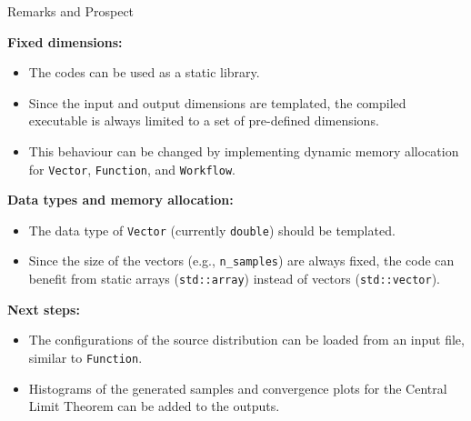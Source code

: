 \documentclass[8pt]{beamer}
\begin{document}
\begin{frame}{Remarks and Prospect}

    \textbf{Fixed dimensions:}
    \begin{itemize}
        \item The codes can be used as a static library.
        \item Since the input and output dimensions are templated, the compiled executable is always limited to a set of pre-defined dimensions.
        \item This behaviour can be changed by implementing dynamic memory allocation for \texttt{Vector}, \texttt{Function}, and \texttt{Workflow}.
    \end{itemize}

    \vfill

    \textbf{Data types and memory allocation:}
    \begin{itemize}
        \item The data type of \texttt{Vector} (currently \texttt{double}) should be templated.
        \item Since the size of the vectors (e.g., \texttt{n\_samples}) are always fixed, the code can benefit from static arrays (\texttt{std::array}) instead of vectors (\texttt{std::vector}).
    \end{itemize}

    \vfill

    \textbf{Next steps:}
    \begin{itemize}
        \item The configurations of the source distribution can be loaded from an input file, similar to \texttt{Function}.
        \item Histograms of the generated samples and convergence plots for the Central Limit Theorem can be added to the outputs.
    \end{itemize}


\end{frame}
\end{document}
